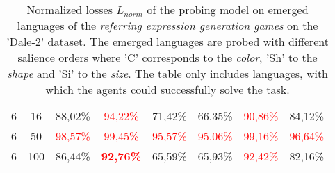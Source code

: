 \begin{table}[ht]
\begin{tabular}{cc|c|c|c|c|c|c}
        {6} & {16}  & {88,02\%}                & \textcolor{red}{94,22\%}          & {71,42\%}                & {66,35\%}                & \textcolor{red}{90,86\%} & {84,12\%}                \\
        {6} & {50}  & \textcolor{red}{98,57\%} & \textcolor{red}{99,45\%}          & \textcolor{red}{95,57\%} & \textcolor{red}{95,06\%} & \textcolor{red}{99,16\%} & \textcolor{red}{96,64\%} \\
        {6} & {100} & {86,44\%}                & \textcolor{red}{\textbf{92,76\%}} & {65,59\%}                & {65,93\%}                & \textcolor{red}{92,42\%} & {82,16\%}                \\
        \bottomrule
    \end{tabular}
    \caption{Normalized losses $L_{norm}$ of the probing model on emerged languages of the \emph{referring expression generation games} on the 'Dale-2' dataset. The emerged languages are probed with different salience orders where 'C' corresponds to the \emph{color}, 'Sh' to the \emph{shape} and 'Si' to the \emph{size}. The table only includes languages, with which the agents could successfully solve the task.}
    \label{tab:probing:re-generator:dale-2}
\end{table}

